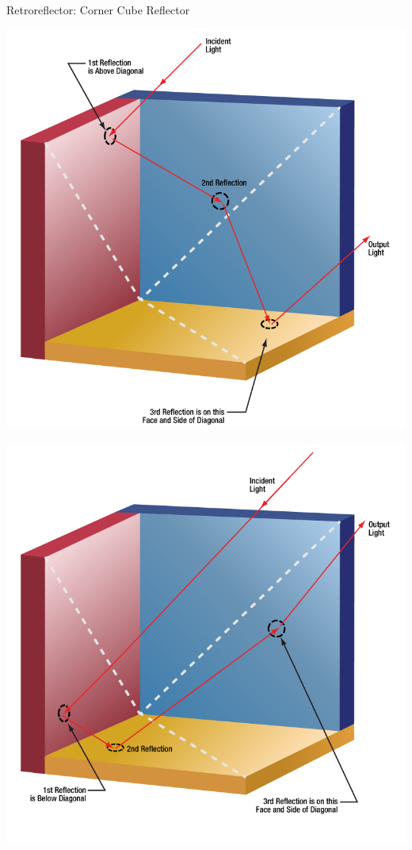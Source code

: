 \documentclass{beamer}
\begin{document}
\begin{frame}{Retroreflector: Corner Cube Reflector}
\begin{center}
	\includegraphics[scale=0.25]{15.png}
\end{center}
\end{frame}
\begin{frame}
\begin{center}
	\includegraphics[scale=0.25]{20.png}
\end{center}
\end{frame}
\end{document}
